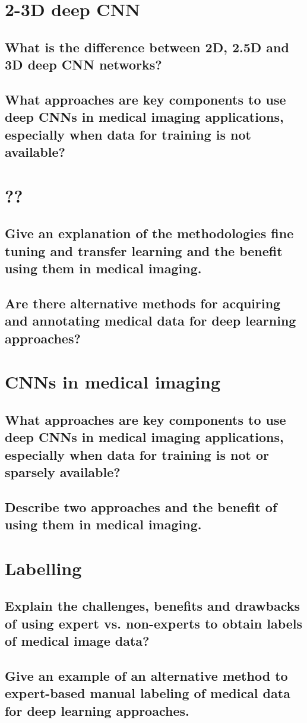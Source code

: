 \section{2-3D deep CNN}
\subsection{What is the difference between 2D, 2.5D and 3D deep CNN networks?}
\subsection{What approaches are key components to use deep CNNs in medical imaging applications, especially when data for training is not available?}

\section{??}
\subsection{Give an explanation of the methodologies fine tuning and transfer learning and the benefit using them in medical imaging. }
\subsection{Are there alternative methods for acquiring and annotating medical data for deep learning approaches?}

\section{CNNs in medical imaging}
\subsection{What approaches are key components to use deep CNNs in medical imaging applications, especially when data for training is not or sparsely available?}
\subsection{Describe two approaches and the benefit of using them in medical imaging.}

\section{Labelling}
\subsection{Explain the challenges, benefits and drawbacks of using expert vs. non-experts to obtain labels of medical image data?}
\subsection{Give  an example of an alternative method to expert-based manual labeling of medical data for deep learning approaches.}


\addtocounter{section}{-1}\section{}\label{sec:todo}
